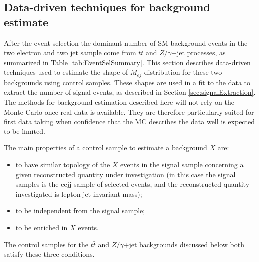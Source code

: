 \documentclass[colclass=cmspaper]{combine}
\begin{document}
\begin{linenumbers}







\section{Data-driven techniques for background estimate} \label{sec:bkgStudy}
After the event selection the dominant number of SM background events in the two electron and two jet sample come from $t\bar{t}$ and 
$Z/\gamma$+jet processes, as summarized in Table \ref{tab:EventSelSummary}. 
This section describes data-driven techniques used to estimate the shape of $M_{ej}$ distribution for these two backgrounds using 
control samples. These shapes are used in a fit to the data to extract the number of signal events, as described 
in Section \ref{sec:signalExtraction}. The methods for background estimation described here will not rely on the Monte Carlo 
once real data is available. They are
therefore particularly suited for first data taking when confidence that the MC describes
the data well is expected to be limited.

The main properties of a control sample to estimate a background $X$ are:
\begin{itemize}
%
\item to have similar topology of the $X$ events in the signal sample concerning a given reconstructed quantity 
under investigation (in this case the signal samples is the eejj sample of selected events, 
and the reconstructed quantity investigated is lepton-jet invariant mass);  
%
\item to be independent from the signal sample;
%
\item to be enriched in $X$ events.
%
\end{itemize}
%
The control samples for the $t\bar{t}$ and $Z/\gamma$+jet backgrounds discussed below both satisfy these three conditions.


\end{linenumbers}
\end{document}

